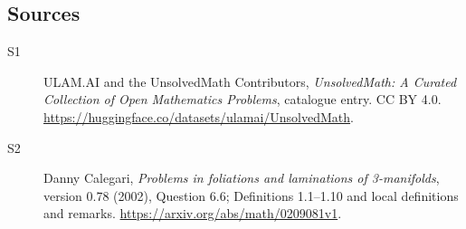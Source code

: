 \documentclass[11pt]{article}
\begin{document}
\subsection{Sources}
\begin{description}
\item[\hypertarget{source:statement:1}{S1}] ULAM.AI and the UnsolvedMath Contributors, \emph{UnsolvedMath: A Curated Collection of Open Mathematics Problems}, catalogue entry. CC BY 4.0. \url{https://huggingface.co/datasets/ulamai/UnsolvedMath}.
\item[\hypertarget{source:statement:2}{S2}] Danny Calegari, \emph{Problems in foliations and laminations of 3-manifolds}, version 0.78 (2002), Question 6.6; Definitions 1.1--1.10 and local definitions and remarks. \url{https://arxiv.org/abs/math/0209081v1}.
\end{description}
\label{end:statement}
\end{document}
